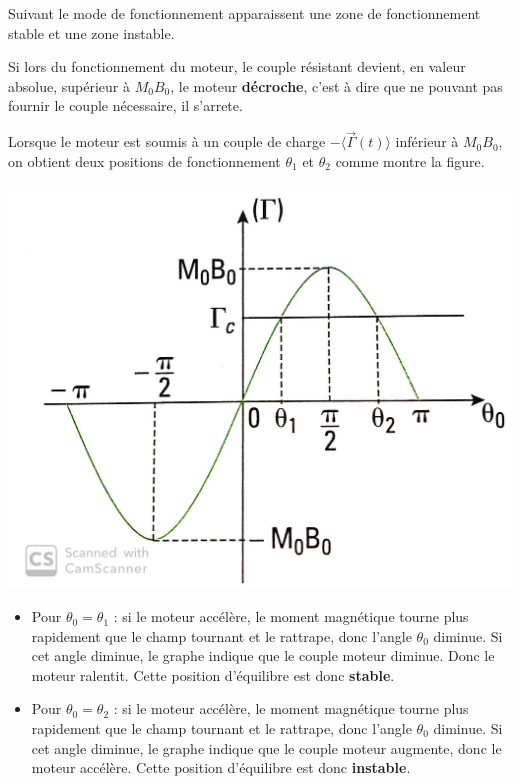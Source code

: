 \documentclass{article}
\begin{document}
Suivant le mode de fonctionnement apparaissent une zone de fonctionnement stable et une zone instable.\medskip

Si lors du fonctionnement du moteur, le couple résistant devient, en valeur absolue, supérieur à $M_0B_0$, le moteur \textbf{décroche}, c'est à dire que ne pouvant pas fournir le couple nécessaire, il s'arrete.\medskip

Lorsque le moteur est soumis à un couple de charge $-\langle \vec{\Gamma}(t) \rangle$ inférieur à $M_0 B_0$, on obtient deux positions de fonctionnement $\theta_1$ et $\theta_2$ comme montre la figure.


\begin{center}
    \includegraphics[scale=0.1]{theta12.jpg}
\end{center}


\begin{itemize}
    \item Pour $\theta_0 = \theta_1$ : si le moteur accélère, le moment magnétique tourne plus rapidement que le champ tournant et le rattrape, donc l'angle $\theta_0$ diminue. Si cet angle diminue, le graphe indique que le couple moteur diminue. Donc le moteur ralentit. Cette position d'équilibre est donc \textbf{stable}.
    \item Pour $\theta_0 = \theta_2$ : si le moteur accélère, le moment magnétique tourne plus rapidement que le champ tournant et le rattrape, donc l'angle $\theta_0$ diminue. Si cet angle diminue, le graphe indique que le couple moteur augmente, donc le moteur accélère. Cette position d'équilibre est donc \textbf{instable}.
\end{itemize}
\end{document}
